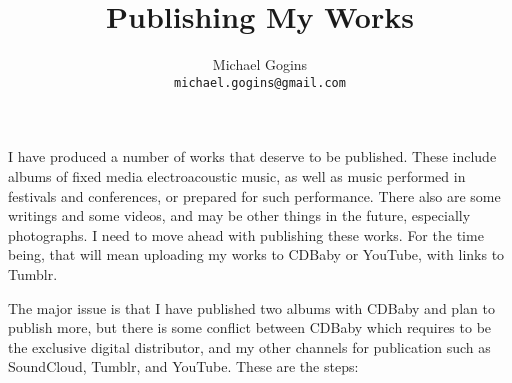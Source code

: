 \documentclass[english,11pt,letterpaper,onecolumn]{scrartcl}
\begin{document}
\title{Publishing My Works}
\author{Michael Gogins \\ \texttt{michael.gogins@gmail.com}}
\maketitle


I have produced a number of works that deserve to be published. These include albums of fixed media electroacoustic music, as well as music performed in festivals and conferences, or prepared for such performance. There also are some writings and some videos, and may be other things in the future, especially photographs. I need to move ahead with publishing these works. For the time being, that will mean uploading my works to CDBaby or YouTube, with links to Tumblr.

The major issue is that I have published two albums with CDBaby and plan to publish more, but there is some conflict between CDBaby which requires to be the exclusive digital distributor, and my other channels for publication such as SoundCloud, Tumblr, and YouTube. These are the steps:
\end{document}
